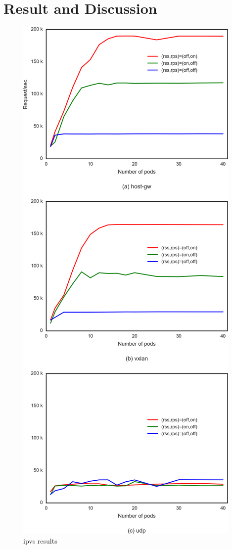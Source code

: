 \section{Result and Discussion}\label{Result and Discussion}

\begin{figure}
\includegraphics[width=\columnwidth]{Figs/ipvs_3figs}
\caption{ipvs results}
\label{fig:ipvs3figs}
\end{figure}

